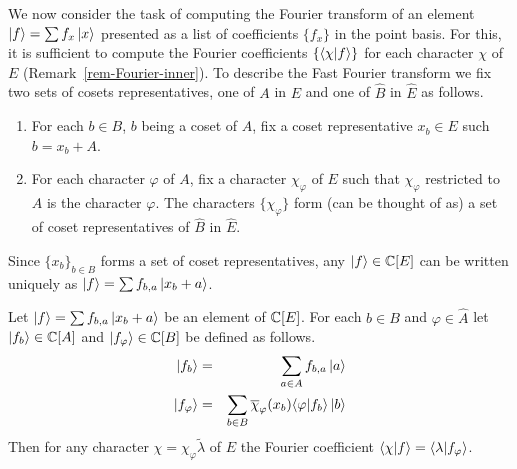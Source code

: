 \documentclass[11pt]{article}
\begin{document}
We now consider the task of computing the Fourier transform of an
element $\left| f \right\rangle = \sum f_x \left| x \right\rangle$ presented as a list of
coefficients $\{f_x\}$ in the point basis. For this, it is sufficient
to compute the Fourier coefficients $\{\langle \chi|f \rangle\}$ for each
character $\chi$ of $E$ (Remark~\ref{rem-Fourier-inner}). To describe
the Fast Fourier transform we fix two sets of cosets representatives,
one of $A$ in $E$ and one of $\hat{B}$ in $\hat{E}$ as follows.

\begin{enumerate}
  \item For each $b \in B$, $b$ being a coset of $A$, fix a coset
    representative $x_b \in E$ such $b = x_b + A$.
  \item For each character $\varphi$ of $A$, fix a character
    $\chi_\varphi$ of $E$ such that $\chi_\varphi$ restricted to $A$ is
    the character $\varphi$. The characters $\{ \chi_\varphi \}$ form
    (can be thought of as) a set of coset representatives of $\hat{B}$
    in $\hat{E}$.
\end{enumerate}

Since $\{ x_b \}_{b \in B}$ forms a set of coset representatives, any
$\left| f \right\rangle \in \mathbb{C}[E]$ can be written uniquely as $\left| f \right\rangle = \sum f_{b,a}
\left| x_b + a \right\rangle$.

\begin{proposition}\label{prop-Fourier-coefficient}
  Let $\left| f \right\rangle = \sum f_{b,a}\left| x_b + a \right\rangle$ be an element of $\mathbb{C}[E]$.
  For each $b \in B$ and $\varphi \in \hat{A}$ let $\left| f_b \right\rangle\in
  \mathbb{C}[A]$ and $\left| f_\varphi \right\rangle \in \mathbb{C}[B]$ be defined as
  follows.
  \begin{eqnarray*}
    \left| f_b \right\rangle &= & \sum_{a \in A} f_{b,a} \left| a \right\rangle\\
    \left| f_\varphi \right\rangle & = &\sum_{b \in B} \overline{\chi}_{\varphi}(x_b)
    \langle \varphi|f_b \rangle \left| b \right\rangle
  \end{eqnarray*}
  Then for any character $\chi = \chi_\varphi\tilde\lambda$ of $E$ the
  Fourier coefficient $\langle \chi|f \rangle =
  \langle \lambda|f_\varphi \rangle$.
\end{proposition}
\end{document}
